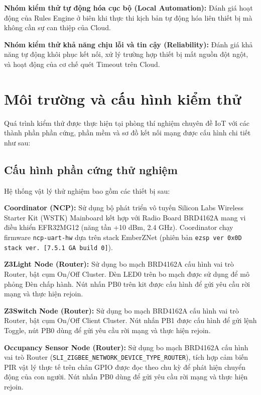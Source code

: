 \textbf{Nhóm kiểm thử tự động hóa cục bộ (Local Automation):} Đánh giá hoạt động của Rules Engine ở biên khi thực thi kịch bản tự động hóa liên thiết bị mà không cần sự can thiệp của Cloud.

\textbf{Nhóm kiểm thử khả năng chịu lỗi và tin cậy (Reliability):} Đánh giá khả năng tự động khôi phục kết nối, xử lý trường hợp thiết bị mất nguồn đột ngột, và hoạt động của cơ chế quét Timeout trên Cloud.

\section{Môi trường và cấu hình kiểm thử}
\label{sec:ch5-test-setup}

Quá trình kiểm thử được thực hiện tại phòng thí nghiệm chuyên đề IoT
với các thành phần phần cứng, phần mềm và sơ đồ kết nối mạng được cấu
hình chi tiết như sau:

\subsection{Cấu hình phần cứng thử nghiệm}
\label{sec:ch5-hw-setup}

Hệ thống vật lý thử nghiệm bao gồm các thiết bị sau:

\textbf{Coordinator (NCP):} Sử dụng bộ phát triển vô tuyến Silicon Labs Wireless Starter Kit (WSTK) Mainboard kết hợp với Radio Board BRD4162A mang vi điều khiển EFR32MG12 (năng tần +10 dBm, 2.4 GHz). Coordinator chạy firmware \texttt{ncp-uart-hw} dựa trên stack EmberZNet (phiên bản \texttt{ezsp ver 0x0D stack ver. [7.5.1 GA build 0]}).

\textbf{Z3Light Node (Router):} Sử dụng bo mạch BRD4162A cấu hình vai trò Router, bật cụm On/Off Cluster. Đèn LED0 trên bo mạch được sử dụng để mô phỏng Đèn chấp hành. Nút nhấn PB0 trên kit được cấu hình để gửi yêu cầu rời mạng và thực hiện rejoin.

\textbf{Z3Switch Node (Router):} Sử dụng bo mạch BRD4162A cấu hình vai trò Router, bật cụm On/Off Client Cluster. Nút nhấn PB1 được cấu hình để gửi lệnh Toggle, nút PB0 dùng để gửi yêu cầu rời mạng và thực hiện rejoin.

\textbf{Occupancy Sensor Node (Router):} Sử dụng bo mạch BRD4162A cấu hình vai trò Router (\texttt{SLI\_ZIGBEE\_NETWORK\_DEVICE\_TYPE\_ROUTER}), tích hợp cảm biến PIR vật lý thực tế trên chân GPIO được đọc theo chu kỳ để phát hiện chuyển động của con người. Nút nhấn PB0 dùng để gửi yêu cầu rời mạng và thực hiện rejoin.

